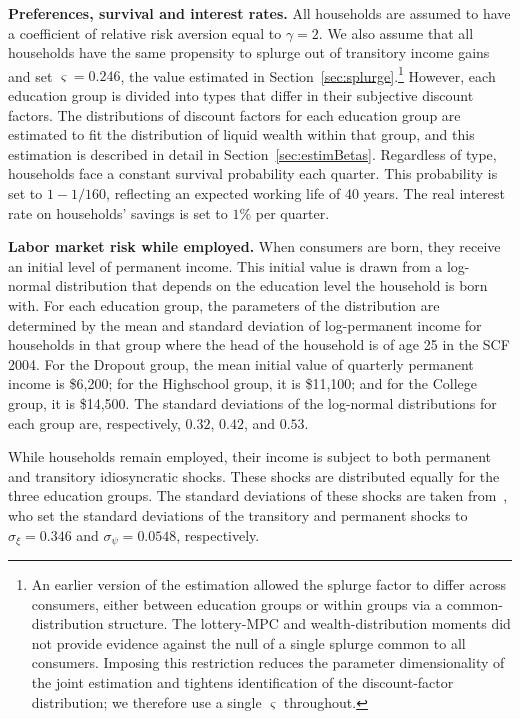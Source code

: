 \documentclass{econsocart}
\begin{document}
\textbf{Preferences, survival and interest rates.} All households are assumed to have a coefficient of relative risk aversion equal to $\gamma=2$.
We also assume that all households have the same propensity to splurge out of transitory income gains and set $\varsigma=0.246$, the value estimated in Section~\ref{sec:splurge}.\footnote{An earlier version of the estimation allowed the splurge factor to differ across consumers, either between education groups or within groups via a common-distribution structure. The lottery-MPC and wealth-distribution moments did not provide evidence against the null of a single splurge common to all consumers. Imposing this restriction reduces the parameter dimensionality of the joint estimation and tightens identification of the discount-factor distribution; we therefore use a single $\varsigma$ throughout.}
However, each education group is divided into types that differ in their subjective discount factors.
The distributions of discount factors for each education group are estimated to fit the distribution of liquid wealth within that group, and this estimation is described in detail in Section~\ref{sec:estimBetas}.
Regardless of type, households face a constant survival probability each quarter.
This probability is set to $1-1/160$, reflecting an expected working life of 40 years.
The real interest rate on households' savings is set to $1\%$ per quarter.


\textbf{Labor market risk while employed.} When consumers are born, they receive an initial level of permanent income.
This initial value is drawn from a log-normal distribution that depends on the education level the household is born with.
For each education group, the parameters of the distribution are determined by the mean and standard deviation of log-permanent income for households in that group where the head of the household is of age 25 in the SCF 2004.
For the Dropout group, the mean initial value of quarterly permanent income is \$6,200; for the Highschool group, it is \$11,100; and for the College group, it is \$14,500.
The standard deviations of the log-normal distributions for each group are, respectively, $0.32$, $0.42$, and $0.53$.

While households remain employed, their income is subject to both permanent and transitory idiosyncratic shocks.
These shocks are distributed equally for the three education groups.
The standard deviations of these shocks are taken from~\cite{carroll2020sticky}, who set the standard deviations of the transitory and permanent shocks to $\sigma_\xi=0.346$ and $\sigma_\psi=0.0548$, respectively.
\end{document}
